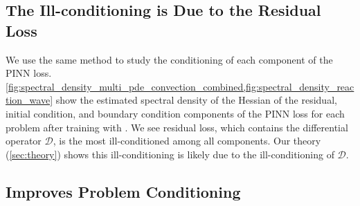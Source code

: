 \subsection{The Ill-conditioning is Due to the Residual Loss}


We use the same method to study the conditioning of each component of the PINN loss. \cref{fig:spectral_density_multi_pde_convection_combined,fig:spectral_density_reaction_wave} show the estimated spectral density of the Hessian of the residual, initial condition, and boundary condition components of the PINN loss for each problem after training with \al. 
We see residual loss, which contains the differential operator $\mathcal D$, is the most ill-conditioned among all components.
Our theory (\cref{sec:theory}) shows this ill-conditioning is likely due to the ill-conditioning of $\mathcal D$.

\subsection{\lbfgs{} Improves Problem Conditioning}
\label{subsec:lbfgs_improvement}


